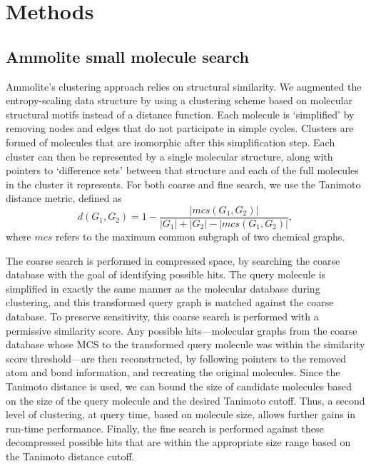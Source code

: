 \documentclass[review,preprint,12pt]{elsarticle}
\theoremstyle{definition}
\theoremstyle{remark}
\numberwithin{equation}{section}
\begin{document}
\section{Methods}

\subsection{Ammolite small molecule search}
Ammolite's clustering approach relies on structural similarity.
We augmented the entropy-scaling data structure by using a clustering scheme based on molecular structural motifs instead of a distance function.
Each molecule is `simplified' by removing nodes and edges that do not
participate in simple cycles.
Clusters are formed of molecules that are isomorphic after this simplification
step.
Each cluster can then be represented by a single molecular structure, along 
with pointers to `difference sets'  between that structure and each of the 
full molecules in the cluster it represents.
For both coarse and fine search, we use the Tanimoto distance metric, defined as
\[d(G_1,G_2) = 1 - \frac{ |mcs(G_1,G_2)| }{|G_1|+|G_2|-|mcs(G_1,G_2)|},\]
where $mcs$ refers to the maximum common subgraph of two chemical graphs. 

The coarse search is performed in compressed space, by searching 
the coarse database with the goal of identifying possible hits.
The query molecule is simplified in exactly the same manner as 
the molecular database during clustering, and this transformed query graph is 
matched against the coarse database.
To preserve sensitivity, this coarse search is performed with a permissive 
similarity score.
Any possible hits---molecular graphs from the coarse database whose MCS to 
the transformed query molecule was within the similarity score threshold---are 
then reconstructed, by following
pointers to the removed atom and bond information, and recreating the 
original molecules.
Since the Tanimoto distance is used, we can bound the size of candidate 
molecules based on the size of the query molecule and the desired Tanimoto 
cutoff.
Thus, a second level of clustering, at query time, based on molecule size, 
allows further gains in run-time performance.
Finally, the fine search is performed against these decompressed possible 
hits that are within the appropriate size range based on the Tanimoto distance
cutoff.
\end{document}
